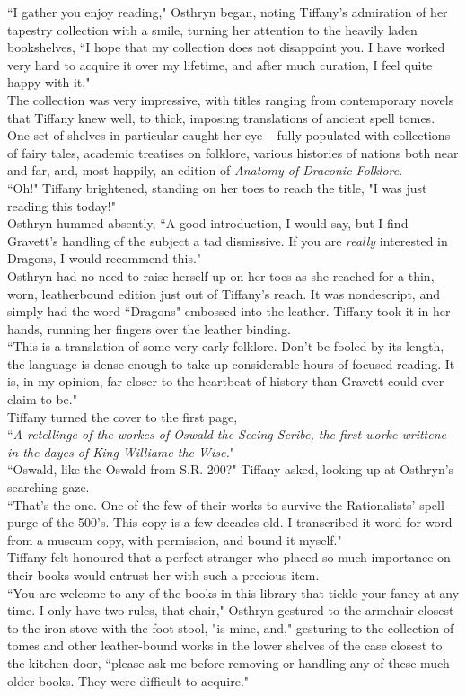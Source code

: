 ``I gather you enjoy reading," Osthryn began, noting Tiffany's admiration of her tapestry collection with a smile, turning her attention to the heavily laden bookshelves, ``I hope that my collection does not disappoint you. I have worked very hard to acquire it over my lifetime, and after much curation, I feel quite happy with it."\\
The collection was very impressive, with titles ranging from contemporary novels that Tiffany knew well, to thick, imposing translations of ancient spell tomes.
One set of shelves in particular caught her eye -- fully populated with collections of fairy tales, academic treatises on folklore, various histories of nations both near and far, and, most happily, an edition of \textit{Anatomy of Draconic Folklore}.\\

``Oh!" Tiffany brightened, standing on her toes to reach the title, "I was just reading this today!"\\
Osthryn hummed absently, ``A good introduction, I would say, but I find Gravett's handling of the subject a tad dismissive. If you are \textit{really} interested in Dragons, I would recommend this."\\
Osthryn had no need to raise herself up on her toes as she reached for a thin, worn, leatherbound edition just out of Tiffany's reach.
It was nondescript, and simply had the word ``Dragons" embossed into the leather.
Tiffany took it in her hands, running her fingers over the leather binding.\\
``This is a translation of some very early folklore. Don't be fooled by its length, the language is dense enough to take up considerable hours of focused reading. It is, in my opinion, far closer to the heartbeat of history than Gravett could ever claim to be."\\
Tiffany turned the cover to the first page,\\

``\textit{A retellinge of the workes of Oswald the Seeing-Scribe, the first worke writtene in the dayes of King Williame the Wise.}"\\

``Oswald, like the Oswald from S.R. 200?" Tiffany asked, looking up at Osthryn's searching gaze.\\
``That's the one. One of the few of their works to survive the Rationalists' spell-purge of the 500's. This copy is a few decades old. I transcribed it word-for-word from a museum copy, with permission, and bound it myself."\\
Tiffany felt honoured that a perfect stranger who placed so much importance on their books would entrust her with such a precious item.\\
``You are welcome to any of the books in this library that tickle your fancy at any time. I only have two rules, that chair," Osthryn gestured to the armchair closest to the iron stove with the foot-stool, "is mine, and," gesturing to the collection of tomes and other leather-bound works in the lower shelves of the case closest to the kitchen door, ``please ask me before removing or handling any of these much older books. They were difficult to acquire."\\

